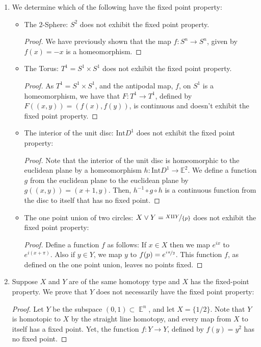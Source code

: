 \documentclass{book}
\DeclareMathOperator*{\E}{\mathbb{E}}
\begin{document}
\begin{enumerate}[(1)]
    \item We determine which of the following have the fixed point property: 
        \begin{itemize}
            \item The $2$-Sphere: $S^2$ does not exhibit the fixed point property. 
                \begin{proof}
                    We have previously shown that the map $f:S^n \rightarrow S^n$, given by $f(x) = -x$ is a homeomorphism.
                \end{proof}

            \item The Torus: $T^1 = S^1 \times S^1$ does not exhibit the fixed point property. 
                \begin{proof}
                    As $T^1 = S^1 \times S^1$, and the antipodal map, $f$, on $S^1$ is a homeomorphism, we have that $F: T^1 \rightarrow T^1$, defined by $F((x,y)) = (f(x),f(y))$, is continuous and doesn't exhibit the fixed point property. 
                \end{proof}

            \item The interior of the unit disc: $\text{Int}D^1$ does not exhibit the fixed point property: 
                \begin{proof} Note that the interior of the unit disc is homeomorphic to the euclidean plane by a homeomorphism $h: \text{Int}D^1 \rightarrow \mathbb{E}^2$. We define a function $g$ from the euclidean plane to the euclidean plane by $g((x,y))=(x+1,y)$. Then, $h^{-1}\circ g\circ h$ is a continuous function from the disc to itself that has no fixed point.
                \end{proof}

            \item The one point union of two circles: $X \vee Y = \nicefrac{ X  \amalg Y }{\{p\}}$ does not exhibit the fixed point property: 
                \begin{proof} Define a function $f$ as follows: If $x\in X$ then we map $e^{ix}$ to $e^{i(x+\pi)}$. Also if $y \in Y$, we map $y$ to $f(p)=e^{\nicefrac{i\pi}{2}}$. This function $f$, as defined on the one point union, leaves no points fixed.
                \end{proof}
        \end{itemize}

    \item Suppose $X$ and $Y$ are of the same homotopy type and $X$ has the fixed-point property. We prove that $Y$ does not necessarily have the fixed point property: 
        \begin{proof} Let $Y$ be the subspace $(0,1) \subset \E^n$, and let $X = \{1/2\}$. Note that $Y$ is homotopic to $X$ by the straight line homotopy, and every map from $X$ to itself has a fixed point. Yet, the function $f: Y \rightarrow Y$, defined by $f(y)=y^2$ has no fixed point. 
        \end{proof}


\end{enumerate}
\end{document}

